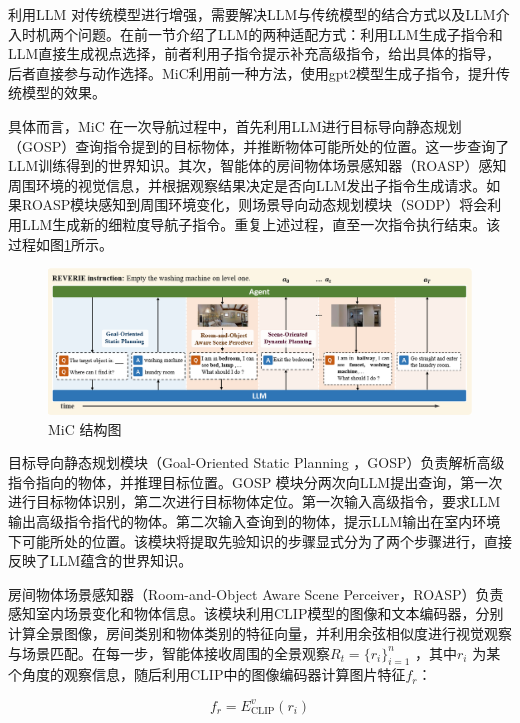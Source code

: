 \documentclass[bachelor]{thesis-uestc}
\begin{document}
利用LLM 对传统模型进行增强，需要解决LLM与传统模型的结合方式以及LLM介入时机两个问题。在前一节介绍了LLM的两种适配方式：利用LLM生成子指令和LLM直接生成视点选择，前者利用子指令提示补充高级指令，给出具体的指导，后者直接参与动作选择。MiC利用前一种方法，使用gpt2模型生成子指令，提升传统模型的效果。

具体而言，MiC 在一次导航过程中，首先利用LLM进行目标导向静态规划（GOSP）查询指令提到的目标物体，并推断物体可能所处的位置。这一步查询了LLM训练得到的世界知识。其次，智能体的房间物体场景感知器（ROASP）感知周围环境的视觉信息，并根据观察结果决定是否向LLM发出子指令生成请求。如果ROASP模块感知到周围环境变化，则场景导向动态规划模块（SODP）将会利用LLM生成新的细粒度导航子指令。重复上述过程，直至一次指令执行结束。该过程如图\ref{mic}所示。

\begin {figure}[h]
\centering %
\includegraphics[width=\textwidth]{1424-042816.png}
\caption{MiC 结构图} %
\label{mic}
\end {figure}


目标导向静态规划模块（Goal-Oriented Static Planning ，GOSP）负责解析高级指令指向的物体，并推理目标位置。GOSP 模块分两次向LLM提出查询，第一次进行目标物体识别，第二次进行目标物体定位。第一次输入高级指令，要求LLM输出高级指令指代的物体。第二次输入查询到的物体，提示LLM输出在室内环境下可能所处的位置。该模块将提取先验知识的步骤显式分为了两个步骤进行，直接反映了LLM蕴含的世界知识。

房间物体场景感知器（Room-and-Object Aware Scene Perceiver，ROASP）负责感知室内场景变化和物体信息。该模块利用CLIP模型的图像和文本编码器，分别计算全景图像，房间类别和物体类别的特征向量，并利用余弦相似度进行视觉观察与场景匹配。在每一步，智能体接收周围的全景观察$R_t = \{r_i\}_{i=1}^n$ ，其中$r_i$ 为某个角度的观察信息，随后利用CLIP中的图像编码器计算图片特征$f_r$：

\begin{equation}
    f_r = E^{v}_{\text{CLIP}}(r_i)
\label{fr}
\end{equation}
\end{document}
